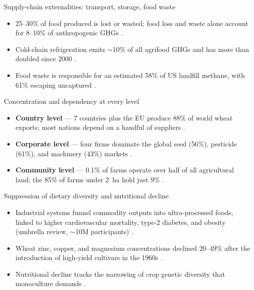 \documentclass{beamer}
\begin{document}
\begin{frame}{Supply-chain externalities: transport, storage, food waste}
    \begin{itemize}
        \item 25--30\% of food produced is lost or wasted; food loss and waste alone account for 8--10\% of anthropogenic GHGs \cite[Section~5.5.2.5]{ipcc2019srccl}. \vspace{6mm}
        \item Cold-chain refrigeration emits $\sim$10\% of all agrifood GHGs and has more than doubled since 2000 \cite[Section~3]{flammini2024coldchain}. \vspace{6mm}
        \item Food waste is responsible for an estimated 58\% of US landfill methane, with 61\% escaping uncaptured \cite[Table~3]{epa2023methane}.
    \end{itemize}
\end{frame}

\begin{frame}{Concentration and dependency at every level}
    \begin{itemize}
        \item \textbf{Country level} --- 7 countries plus the EU produce 88\% of world wheat exports; most nations depend on a handful of suppliers \cite[16]{usda2025grain}. \vspace{4mm}
        \item \textbf{Corporate level} --- four firms dominate the global seed (56\%), pesticide (61\%), and machinery (43\%) markets \cite{etcgroup2025agribusiness}. \vspace{4mm}
        \item \textbf{Community level} --- 0.1\% of farms operate over half of all agricultural land; the 85\% of farms under 2~ha hold just 9\% \cite[Chapter~3]{fao2025sofa}.
    \end{itemize}
\end{frame}

\begin{frame}{Suppression of dietary diversity and nutritional decline}
    \begin{itemize}
        \item Industrial systems funnel commodity outputs into ultra-processed foods, linked to higher cardiovascular mortality, type-2 diabetes, and obesity (umbrella review, $\sim$10M participants) \cite[Figures~2--3]{lane2024upf}. \vspace{6mm}
        \item Wheat zinc, copper, and magnesium concentrations declined 20--49\% after the introduction of high-yield cultivars in the 1960s \cite[Tables~2,~4]{fan2008nutrient}. \vspace{6mm}
        \item Nutritional decline tracks the narrowing of crop genetic diversity that monoculture demands \cite{monteiro2025upf}.
    \end{itemize}
\end{frame}
\end{document}
